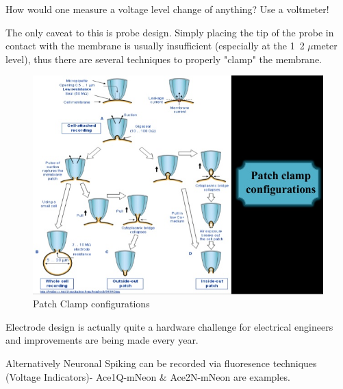 \documentclass[main]{subfiles}
\begin{document}
How would one measure a voltage level change of anything? Use a voltmeter!

The only caveat to this is probe design. Simply placing the tip of the probe in contact with the membrane is usually insufficient (especially at the 1~2 $\mu$meter level), thus there are several techniques to properly "clamp" the membrane.

\begin{figure}[H]
	\centering
	\includegraphics[width=0.9\linewidth]{09_WhySpikes/figures/patch-clam-technique-10-638.jpg}
	\caption{Patch Clamp configurations}
\end{figure}

Electrode design is actually quite a hardware challenge for electrical engineers and improvements are being made every year.


Alternatively Neuronal Spiking can be recorded via fluoresence techniques (Voltage Indicators)- Ace1Q-mNeon \& Ace2N-mNeon are examples. 
\end{document}
